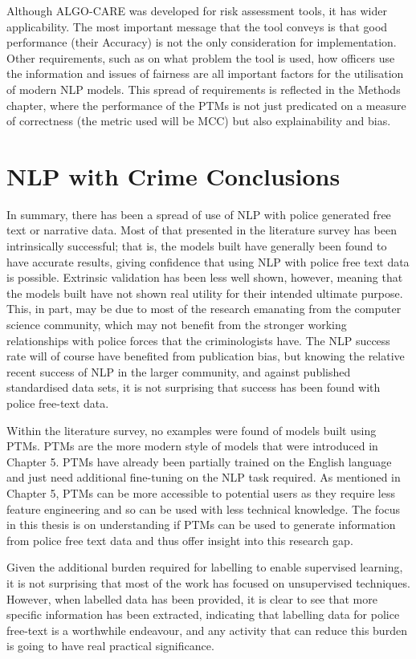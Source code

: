 Although ALGO-CARE was developed for risk assessment tools, it has wider applicability. The most important message that the tool conveys is that good performance (their Accuracy) is not the only consideration for implementation. Other requirements, such as on what problem the tool is used, how officers use the information and issues of fairness are all important factors for the utilisation of modern NLP models. This spread of requirements is reflected in the Methods chapter, where the performance of the PTMs is not just predicated on a measure of correctness (the metric used will be MCC) but also explainability and bias.


\section{ NLP with Crime Conclusions} In summary, there has been a spread of use of NLP with police generated free text or narrative data. Most of that presented in the literature survey has been intrinsically successful; that is, the models built have generally been found to have accurate results, giving confidence that using NLP with police free text data is possible. Extrinsic validation has been less well shown, however, meaning that the models built have not shown real utility for their intended ultimate purpose. This, in part, may be due to most of the research emanating from the computer science community, which may not benefit from the stronger working relationships with police forces that the criminologists have. The NLP success rate will of course have benefited from publication bias, but knowing the relative recent success of NLP in the larger community, and against published standardised data sets, it is not surprising that success has been found with police free-text data.

Within the literature survey, no examples were found of models built using PTMs. PTMs are the more modern style of models that were introduced in Chapter 5. PTMs have already been partially trained on the English language and just need additional fine-tuning on the NLP task required. As mentioned in Chapter 5, PTMs can be more accessible to potential users as they require less feature engineering and so can be used with less technical knowledge. The focus in this thesis is on understanding if PTMs can be used to generate information from police free text data and thus offer insight into this research gap.

Given the additional burden required for labelling to enable supervised learning, it is not surprising that most of the work has focused on unsupervised techniques. However, when labelled data has been provided, it is clear to see that more specific information has been extracted, indicating that labelling data for police free-text is a worthwhile endeavour, and any activity that can reduce this burden is going to have real practical significance. 


